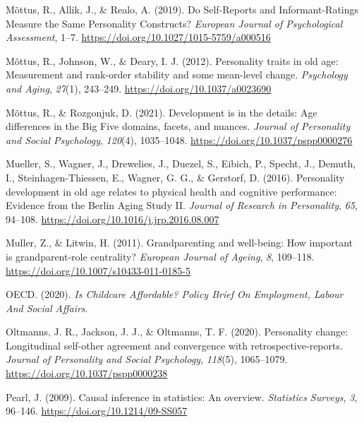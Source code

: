 \documentclass[
  english,
  man, noextraspace,floatsintext]{apa7}
\begin{document}
\leavevmode\hypertarget{ref-mottusSelfReportsInformantRatingsMeasure2019}{}%
Mõttus, R., Allik, J., \& Realo, A. (2019). Do Self-Reports and Informant-Ratings Measure the Same Personality Constructs? \emph{European Journal of Psychological Assessment}, 1--7. \url{https://doi.org/10.1027/1015-5759/a000516}

\leavevmode\hypertarget{ref-mottusPersonalityTraitsOld2012}{}%
Mõttus, R., Johnson, W., \& Deary, I. J. (2012). Personality traits in old age: Measurement and rank-order stability and some mean-level change. \emph{Psychology and Aging}, \emph{27}(1), 243--249. \url{https://doi.org/10.1037/a0023690}

\leavevmode\hypertarget{ref-mottusDevelopmentDetailsAge2021}{}%
Mõttus, R., \& Rozgonjuk, D. (2021). Development is in the details: Age differences in the Big Five domains, facets, and nuances. \emph{Journal of Personality and Social Psychology}, \emph{120}(4), 1035--1048. \url{https://doi.org/10.1037/pspp0000276}

\leavevmode\hypertarget{ref-muellerPersonalityDevelopmentOld2016}{}%
Mueller, S., Wagner, J., Drewelies, J., Duezel, S., Eibich, P., Specht, J., Demuth, I., Steinhagen-Thiessen, E., Wagner, G. G., \& Gerstorf, D. (2016). Personality development in old age relates to physical health and cognitive performance: Evidence from the Berlin Aging Study II. \emph{Journal of Research in Personality}, \emph{65}, 94--108. \url{https://doi.org/10.1016/j.jrp.2016.08.007}

\leavevmode\hypertarget{ref-mullerGrandparentingWellbeingHow2011}{}%
Muller, Z., \& Litwin, H. (2011). Grandparenting and well-being: How important is grandparent-role centrality? \emph{European Journal of Ageing}, \emph{8}, 109--118. \url{https://doi.org/10.1007/s10433-011-0185-5}

\leavevmode\hypertarget{ref-oecdChildcareAffordablePolicy2020}{}%
OECD. (2020). \emph{Is Childcare Affordable? Policy Brief On Employment, Labour And Social Affairs}.

\leavevmode\hypertarget{ref-oltmannsPersonalityChangeLongitudinal2020}{}%
Oltmanns, J. R., Jackson, J. J., \& Oltmanns, T. F. (2020). Personality change: Longitudinal self-other agreement and convergence with retrospective-reports. \emph{Journal of Personality and Social Psychology}, \emph{118}(5), 1065--1079. \url{https://doi.org/10.1037/pspp0000238}

\leavevmode\hypertarget{ref-pearlCausalInferenceStatistics2009}{}%
Pearl, J. (2009). Causal inference in statistics: An overview. \emph{Statistics Surveys}, \emph{3}, 96--146. \url{https://doi.org/10.1214/09-SS057}
\end{document}
